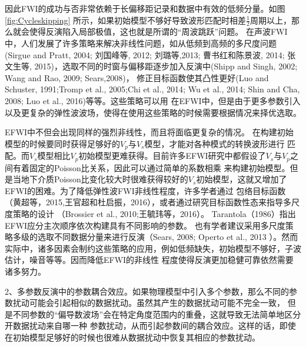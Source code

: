 因此FWI的成功与否非常依赖于长偏移距记录和数据中有效的低频分量。如图\ref{fig:Cycleskipping}
所示，如果初始模型不够好导致波形匹配时相差$\frac{1}{2}$周期以上，那么就会使得反演陷入局部极值，这也就是所谓的“周波跳跃”问题。
在声波FWI中，人们发展了许多策略来解决非线性问题，如从低频到高频的多尺度问题(Sirgue and
Pratt, 2004\cite{sirgue.pratt:2004}; 刘国峰等, 2012\cite{刘国峰2012};
刘璐等,2013\cite{刘璐2013}; 曹书红和陈景波, 2014\cite{曹书红2014}; 
张文生等, 2015\cite{张文生2015})，选取不同的时窗与偏移距逐步加入反演中(Shipp and
Singh, 2002\cite{shipp:2002}; Wang and Rao, 2009\cite{WangEtAl2009}; Sears,2008\cite{sears2008})，
修正目标函数使其凸性更好(Luo and Schuster, 1991\cite{luo1991};Tromp et al.,
2005\cite{tromp2005seismic};Chi
et al., 2014\cite{ChiEtAl2014}; Wu et al., 2014\cite{Wu2014b}; Shin and Cha,
2008\cite{shin.cha:2008}; Luo et al., 2016\cite{Luo2016})等等。这些策略可以用
在EFWI中，但是由于更多参数引入以及更复杂的弹性波波场，使得在使用这些策略的时候需要根据情况来择优选取。

EFWI中不但会出现同样的强烈非线性，而且将面临更复杂的情况。
在构建初始模型的时候要同时获得足够好的$V_p$与$V_s$模型，才能对各种模式的转换波形进行
匹配。而$V_s$模型相比$V_p$初始模型更难获得。目前许多EFWI研究中都假设了$V_s$与$V_p$之间有着固定的Poisson比关系，因此可以通过简单的系数相乘
来构建初始模型。但是当地下介质Poisson比变化较大时很难获得较好的$V_s$初始模型，这就又增加了EFWI的困难。为了降低弹性波FWI非线性程度，许多学者通过
包络目标函数（黄超等，2015\cite{黄超2015},王官超和杜启振，2016\cite{王官超2016}），或者通过研究目标函数性态来指导多尺度策略的设计
（Brossier et al., 2010\cite{BrossierEtAl2010};王毓玮等，2016\cite{王毓玮2016}）。
Tarantola（1986）\cite{tarantola:1986}指出EFWI应分主次顺序依次构建具有不同影响的参数。
也有学者建议采用多尺度策略多级的选取不同数据分量来进行反演（Sears, 2008\cite{sears2008}; Operto et al., 2013
\cite{operto2013guided}）。然而实际中，诸多因素会制约这些策略的应用，例如低频缺失，初始模型不够好，子波估计，噪音等等。因而降低EFWI的非线性
程度使得反演更加稳健可靠依然需要诸多努力。

2、多参数反演中的参数耦合效应。如果物理模型中引入多个参数，那么不同的参数扰动可能会引起相似的数据扰动。虽然其产生的数据扰动可能不完全一致，
但是不同参数的“偏导数波场\cite{pratt1998gauss}”会在特定角度范围内的重叠，这就导致无法简单地区分开数据扰动来自哪一种
参数扰动，从而引起参数间的耦合效应。这样的话，即使在初始模型足够好的时候也很难从数据扰动中恢复其相应的参数扰动。

